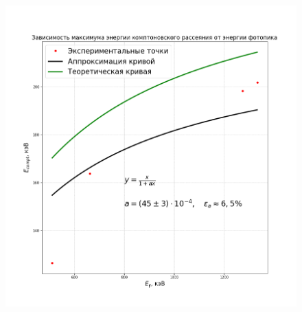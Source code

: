 \documentclass[a4paper,12pt]{article}
\begin{document}
\begin{figure}[H]\label{fig: Ecompt(Egamma)}
    \centering
    \includegraphics[width = \textwidth]{Ecompt(Egamma).png}
\end{figure}
\newpage



\end{document}
